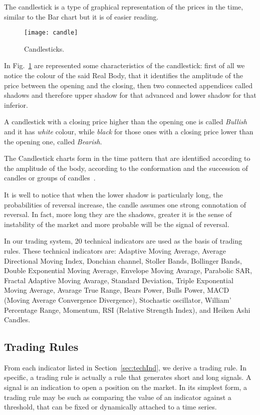 The candlestick is a type of graphical representation of the prices in the time, similar to the Bar chart but it is of easier reading.

\begin{figure}[h]
\texttt{[image: candle]}
\centering
\caption{Candlesticks.}
\label{fig:candle} 
\end{figure}

In Fig.~\ref{fig:candle} are represented some characteristics of the candlestick: first of all we notice the colour of the said Real Body, that it identifies the amplitude of the price between the opening and the closing, then two connected appendices called shadows and therefore upper shadow for that advanced and lower shadow for that inferior.

A candlestick with a closing price higher than the opening one is called \textit{Bullish} and it has \textit{white} colour, while \textit{black} for those ones with a closing price lower than the opening one, called \textit{Bearish}.

The Candlestick charts form in the time pattern that are identified according to the amplitude of the body, according to the conformation and the succession of candles or groups of candles~\cite{OZTURK2016170}.

It is well to notice that when the lower shadow is particularly long, the probabilities of reversal increase, the candle assumes one strong connotation of reversal. In fact, more long they are the shadows, greater it is the sense of instability of the market and more probable will be the signal of reversal.


In our trading system, 20 technical indicators are used as the basis of trading rules. These technical indicators are: Adaptive Moving Average, Average Directional Moving Index, Donchian channel, Stoller Bands, Bollinger Bands, Double Exponential Moving Average, Envelope Moving Avarage, Parabolic SAR, Fractal Adaptive Moving Avarage, Standard Deviation, Triple Exponential Moving Average, Avarage True Range, Bears Power, Bulls Power, MACD (Moving Average Convergence Divergence), Stochastic oscillator, William' Percentage Range, Momentum, RSI (Relative Strength Index), and Heiken Ashi Candles.

\subsection{Trading Rules}
From each indicator listed in Section~\ref{sec:techInd}, we derive a trading rule. In specific, a trading rule is actually a rule that generates short and long signals. A signal is an indication to open a position on the market. In its simplest form, a trading rule may be such as comparing the value of an indicator against a threshold, that can be fixed or dynamically attached to a time series.

